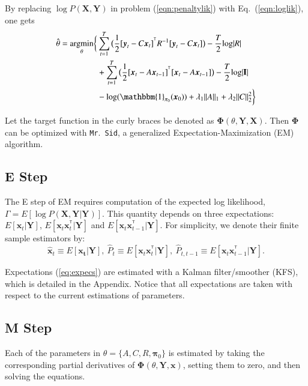 \documentclass[times,twocolumn,final,authoryear]{elsarticle}
\newcommand{\mrsid}{{\sc \texttt{Mr}.~\texttt{Sid}}}
\providecommand{\mb}[1]{\boldsymbol{#1}}
\newcommand{\bx}{\mb{x}}
\newcommand{\by}{\mb{y}}
\newcommand{\bX}{\mb{X}}
\newcommand{\bY}{\mb{Y}}
\newcommand{\T}{^{\ensuremath{\mathsf{T}}}}           %
\newcommand{\argmin}{\operatornamewithlimits{argmin}}
\let\oldref\ref
\renewcommand{\ref}[1]{(\oldref{#1})}
\begin{document}
By replacing $\log  P(\bX,\bY)$ in problem \ref{eqn:penaltylik} with Eq.~\ref{eqn:loglik}, one gets
\begin{equation}\label{eqn:penaltylik2}
\begin{split}
\hat{\theta}=\argmin_{\substack{\theta}}\biggl\{&\sum\limits_{t=1}^{T}\big(\frac{1}{2}[\by_t-C\bx_t]^{\T}R^{-1}[\by_t-C\bx_t]\big)-\frac{T}{2}\text{log}|R|\\
&+\sum\limits_{t=1}^{T}\big(\frac{1}{2}[\bx_t-A\bx_{t-1}]^{\T}[\bx_t-A\bx_{t-1}]\big)-\frac{T}{2}\text{log}|\mathbf{I}|\\
&- \text{log}(\mathbbm{1}_{\mathbf{\pi}_0}(\bx_0))+\lambda_1\|A\|_1+\lambda_2\|C\|_2^2\biggr\}\\
\end{split}
\end{equation}

Let the target function in the curly braces be denoted  as $\mathbf{\Phi}(\theta,\bY,\bX)$. Then $\mathbf{\Phi}$ can be optimized with \mrsid, a generalized Expectation-Maximization (EM) algorithm.

\subsection{E Step}
The E step of EM requires computation of the expected log likelihood, $\Gamma = E[\log P(\bX,\bY|\bY)]$. This quantity depends on three expectations: $E[\bx_t|\bY]$, $E[\bx_t\bx_t^{\T}|\bY]$ and $E[\bx_t\bx_{t-1}^{\T}|\bY]$. For simplicity, we denote their finite sample estimators by:
\begin{equation}\label{eq:expecs}
\hat{\bx}_t \equiv E[\mathbf{x_t}|\bY],\  \hat{P}_t  \equiv E[\bx_t\bx_t^{\T}|\bY],\  \hat{P}_{t,t-1}  \equiv E[\bx_t\bx_{t-1}^{\T}|\bY].
\end{equation}

Expectations \ref{eq:expecs} are estimated with a Kalman filter/smoother (KFS), which is detailed in the Appendix. Notice that all expectations are taken with respect to the current estimations of parameters.
\subsection{M Step}
Each of the parameters in $\theta =\{A,C,R,\mathbf{\pi}_0\}$ is estimated by taking the corresponding partial derivatives of $\mathbf{\Phi}(\theta,\bY,\bx)$, setting them to zero, and then solving the equations.
\end{document}
